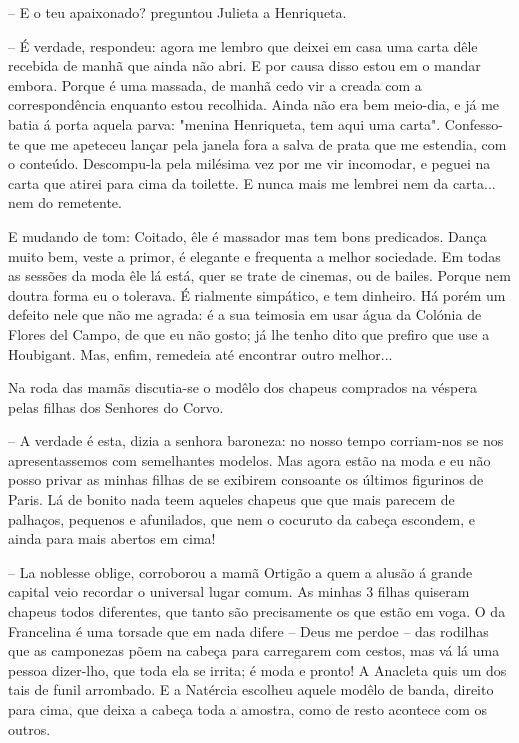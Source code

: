 \documentclass[9pt]{article}
\begin{document}
-- E o teu apaixonado? preguntou Julieta a Henriqueta.

-- É verdade, respondeu: agora me lembro que deixei em casa uma carta
dêle recebida de manhã que ainda não abri. E por causa disso estou em
o mandar embora. Porque é uma massada, de manhã cedo vir a creada com a
correspondên\-cia enquanto estou reco\-lhida. Ainda não era bem meio-dia, e
já me batia á porta aquela parva: "menina Henriqueta, tem aqui uma carta".
Confesso-te que me apeteceu lan\-çar pela janela fora a salva de prata que
me estendia, com o conteúdo. Descompu-la pela milésima vez por me vir incomodar, e peguei na carta que atirei para cima da toilette. E nunca mais
me lembrei nem da carta... nem do remetente.

E mudando de tom: Coitado, êle é massador mas tem bons predicados.
Dan\-ça muito bem, veste a primor, é elegante e frequenta a me\-lhor sociedade.
Em todas as sessões da moda êle lá está, quer se trate de cinemas, ou de
bailes. Porque nem doutra forma eu o tolerava. É rialmente simpático, e
tem dinheiro. Há porém um defeito nele que não me agrada: é a sua teimosia em usar água da Colónia de Flores del Campo, de que eu não gosto;
já lhe tenho dito que prefiro que use a Houbigant. Mas, enfim, remedeia
até encontrar outro me\-lhor...

Na roda das mamãs discutia-se o modêlo dos chapeus comprados na véspera pelas fi\-lhas dos Senhores do Corvo.

-- A verdade é esta, dizia a senhora baroneza: no nosso tempo cor\-riam-nos se nos apresentassemos com seme\-lhantes modelos. Mas agora estão na moda e eu não posso privar as minhas fi\-lhas de se exibirem consoante os últimos figurinos de Paris. Lá de bonito nada teem aqueles chapeus que
que mais parecem de pa\-lhaços, pequenos e afunilados, que nem o cocuruto
da cabeça escondem, e ainda para mais abertos em cima!

-- La noblesse oblige, corroborou a mamã Ortigão a quem a alusão á
gran\-de capital veio recordar o universal lugar comum. As minhas 3 fi\-lhas
quiseram chapeus todos diferentes, que tanto são precisamente os que estão em voga. O da Francelina é uma torsade que em nada difere -- Deus me
perdoe -- das rodi\-lhas que as camponezas põem na cabeça para carregarem
com cestos, mas vá lá uma pessoa dizer-\-lho, que toda ela se irrita; é moda e pronto! A Anacleta quis um dos tais de funil arrombado. E a Natércia esco\-lheu aquele modêlo de banda, direito para cima, que deixa a cabeça toda a amostra, como de resto acontece com os outros.
\end{document}
